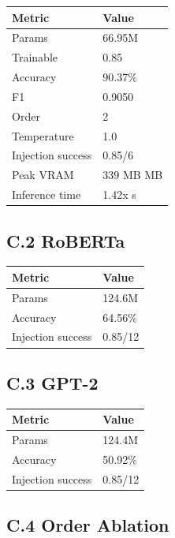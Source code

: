 \begin{table}[H]
\centering
\small
\begin{tabular}{ll}
\toprule
\textbf{Metric} & \textbf{Value} \\
\midrule
Params & 66.95M \\
Trainable & 0.85 \\
Accuracy & 90.37\% \\
F1 & 0.9050 \\
Order & 2 \\
Temperature & 1.0 \\
Injection success & 0.85/6 \\
Peak VRAM & 339 MB MB \\
Inference time & 1.42x s \\
\bottomrule
\end{tabular}
\end{table}

\subsection{C.2 RoBERTa}

\begin{table}[H]
\centering
\small
\begin{tabular}{ll}
\toprule
\textbf{Metric} & \textbf{Value} \\
\midrule
Params & 124.6M \\
Accuracy & 64.56\% \\
Injection success & 0.85/12 \\
\bottomrule
\end{tabular}
\end{table}

\subsection{C.3 GPT-2}

\begin{table}[H]
\centering
\small
\begin{tabular}{ll}
\toprule
\textbf{Metric} & \textbf{Value} \\
\midrule
Params & 124.4M \\
Accuracy & 50.92\% \\
Injection success & 0.85/12 \\
\bottomrule
\end{tabular}
\end{table}

\subsection{C.4 Order Ablation}

